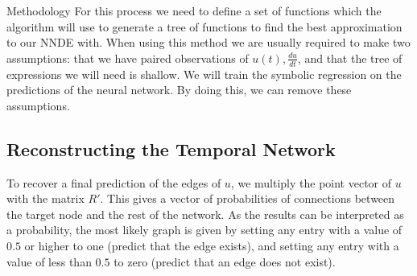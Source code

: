 \documentclass[12pt]{amsart}
\begin{document}
\begin{section}{Methodology}
        For this process we need to define a set of functions which the algorithm will use to generate a tree of functions to find the best approximation to our NNDE with. When using this method we are usually required to make two assumptions: that we have paired observations of $u(t), \frac{du}{dt}$, and that the tree of expressions we will need is shallow. We will train the symbolic regression on the predictions of the neural network. By doing this, we can remove these assumptions\cite{kidger2022neural}.

    \subsection{Reconstructing the Temporal Network}
        To recover a final prediction of the edges of $u$, we multiply the point vector of $u$ with the matrix $R'$. This gives a vector of probabilities of connections between the target node and the rest of the network. As the results can be interpreted as a probability, the most likely graph is given by setting any entry with a value of $0.5$ or higher to one (predict that the edge exists), and setting any entry with a value of less than $0.5$ to zero (predict that an edge does not exist).
\end{section}
\end{document}
